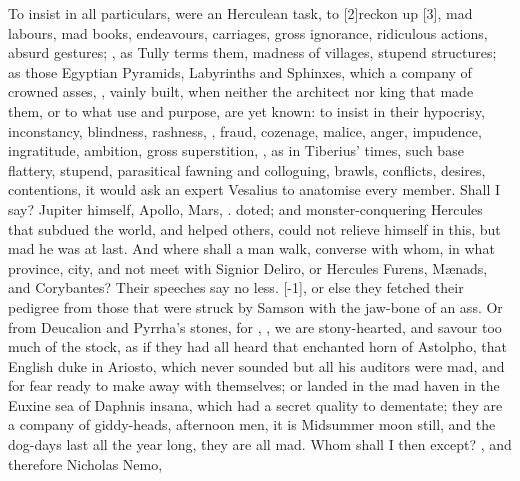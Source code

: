 {To insist in all particulars, were an Herculean task, to
[2\baselineskip]reckon up [3\baselineskip], mad labours, mad books, endeavours, carriages, gross ignorance,
ridiculous actions, absurd gestures; , as Tully terms them, madness of villages, stupend
structures; as those Egyptian Pyramids, Labyrinths and Sphinxes, which
a company of crowned asses, , vainly built, when
neither the architect nor king that made them, or to what use and
purpose, are yet known: to insist in their hypocrisy, inconstancy,
blindness, rashness, , fraud, cozenage, malice,
anger, impudence, ingratitude, ambition, gross superstition,
, as in Tiberius' times, such
base flattery, stupend, parasitical fawning and colloguing, \etc{} brawls,
conflicts, desires, contentions, it would ask an expert Vesalius to
anatomise every member. Shall I say? Jupiter himself, Apollo, Mars, \etc.
doted; and monster-conquering Hercules that subdued the world, and
helped others, could not relieve himself in this, but mad he was at
last. And where shall a man walk, converse with whom, in what province,
city, and not meet with Signior Deliro, or Hercules Furens, M\ae{}nads,
and Corybantes? Their speeches say no less. [-1\baselineskip],
or else they fetched their pedigree from those that were struck by
Samson with the jaw-bone of an ass. Or from Deucalion and Pyrrha's
stones, for ,  , we are
stony-hearted, and savour too much of the stock, as if they had all
heard that enchanted horn of Astolpho, that English duke in Ariosto,
which never sounded but all his auditors were mad, and for fear ready
to make away with themselves; or landed in the mad haven in the
Euxine sea of Daphnis insana, which had a secret quality to dementate;
they are a company of giddy-heads, afternoon men, it is Midsummer moon
still, and the dog-days last all the year long, they are all mad. Whom
shall I then except?   , \etc{} and therefore Nicholas Nemo,
}
